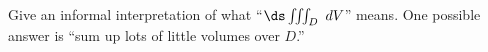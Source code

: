 {Give an informal interpretation of what ``$\ds \iiint_D\ dV$'' means.
}
{One possible answer is ``sum up lots of little volumes over $D$.''
}
